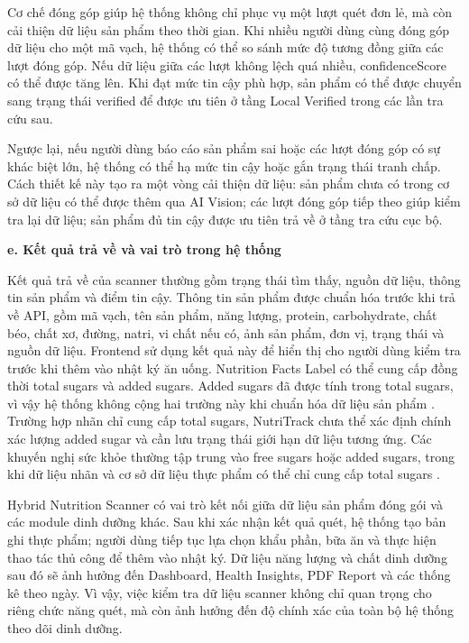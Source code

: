 \documentclass[12pt, a4paper]{report}
\begin{document}
Cơ chế đóng góp giúp hệ thống không chỉ phục vụ một lượt quét đơn lẻ, mà còn cải thiện dữ liệu sản phẩm theo thời gian. Khi nhiều người dùng cùng đóng góp dữ liệu cho một mã vạch, hệ thống có thể so sánh mức độ tương đồng giữa các lượt đóng góp. Nếu dữ liệu giữa các lượt không lệch quá nhiều, confidenceScore có thể được tăng lên. Khi đạt mức tin cậy phù hợp, sản phẩm có thể được chuyển sang trạng thái verified để được ưu tiên ở tầng Local Verified trong các lần tra cứu sau.

Ngược lại, nếu người dùng báo cáo sản phẩm sai hoặc các lượt đóng góp có sự khác biệt lớn, hệ thống có thể hạ mức tin cậy hoặc gắn trạng thái tranh chấp. Cách thiết kế này tạo ra một vòng cải thiện dữ liệu: sản phẩm chưa có trong cơ sở dữ liệu có thể được thêm qua AI Vision; các lượt đóng góp tiếp theo giúp kiểm tra lại dữ liệu; sản phẩm đủ tin cậy được ưu tiên trả về ở tầng tra cứu cục bộ.

\textbf{e. Kết quả trả về và vai trò trong hệ thống}

Kết quả trả về của scanner thường gồm trạng thái tìm thấy, nguồn dữ liệu, thông tin sản phẩm và điểm tin cậy. Thông tin sản phẩm được chuẩn hóa trước khi trả về API, gồm mã vạch, tên sản phẩm, năng lượng, protein, carbohydrate, chất béo, chất xơ, đường, natri, vi chất nếu có, ảnh sản phẩm, đơn vị, trạng thái và nguồn dữ liệu. Frontend sử dụng kết quả này để hiển thị cho người dùng kiểm tra trước khi thêm vào nhật ký ăn uống. Nutrition Facts Label có thể cung cấp đồng thời total sugars và added sugars. Added sugars đã được tính trong total sugars, vì vậy hệ thống không cộng hai trường này khi chuẩn hóa dữ liệu sản phẩm \cite{fda_addedsugars}. Trường hợp nhãn chỉ cung cấp total sugars, NutriTrack chưa thể xác định chính xác lượng added sugar và cần lưu trạng thái giới hạn dữ liệu tương ứng. Các khuyến nghị sức khỏe thường tập trung vào free sugars hoặc added sugars, trong khi dữ liệu nhãn và cơ sở dữ liệu thực phẩm có thể chỉ cung cấp total sugars \cite{mela2018}.

Hybrid Nutrition Scanner có vai trò kết nối giữa dữ liệu sản phẩm đóng gói và các module dinh dưỡng khác. Sau khi xác nhận kết quả quét, hệ thống tạo bản ghi thực phẩm; người dùng tiếp tục lựa chọn khẩu phần, bữa ăn và thực hiện thao tác thủ công để thêm vào nhật ký. Dữ liệu năng lượng và chất dinh dưỡng sau đó sẽ ảnh hưởng đến Dashboard, Health Insights, PDF Report và các thống kê theo ngày. Vì vậy, việc kiểm tra dữ liệu scanner không chỉ quan trọng cho riêng chức năng quét, mà còn ảnh hưởng đến độ chính xác của toàn bộ hệ thống theo dõi dinh dưỡng.
\end{document}
